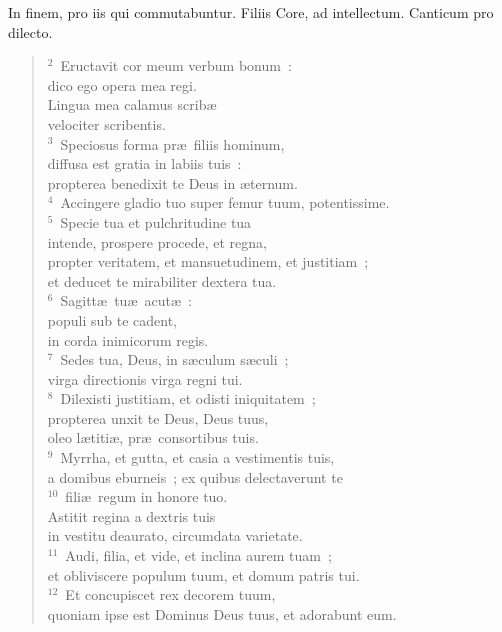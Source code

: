 \bchapter
\lettrine[lines=3,image=true,loversize=0.05,lraise=-0.03]{I}{}n finem, pro iis qui commutabuntur. Filiis Core, ad intellectum. Canticum pro dilecto.
\begin{flushleft}\begin{verse}\vspace{6pt}${}^{2}$~Eructavit cor meum verbum bonum~:\\ dico ego opera mea regi.\\ Lingua mea calamus scrib\ae \\ velociter scribentis.\\
${}^{3}$~Speciosus forma pr\ae\ filiis hominum,\\ diffusa est gratia in labiis tuis~:\\ propterea benedixit te Deus in \ae ternum.\\
${}^{4}$~Accingere gladio tuo super femur tuum, potentissime.\\
${}^{5}$~Specie tua et pulchritudine tua\\ intende, prospere procede, et regna,\\ propter veritatem, et mansuetudinem, et justitiam~;\\ et deducet te mirabiliter dextera tua.\\
${}^{6}$~Sagitt\ae\ tu\ae\ acut\ae~:\\ populi sub te cadent,\\ in corda inimicorum regis.\\
${}^{7}$~Sedes tua, Deus, in s\ae culum s\ae culi~;\\ virga directionis virga regni tui.\\
${}^{8}$~Dilexisti justitiam, et odisti iniquitatem~;\\ propterea unxit te Deus, Deus tuus,\\ oleo l\ae titi\ae , pr\ae\ consortibus tuis.\\
${}^{9}$~Myrrha, et gutta, et casia a vestimentis tuis,\\ a domibus eburneis~; ex quibus delectaverunt te\\
${}^{10}$~fili\ae\ regum in honore tuo.\\ Astitit regina a dextris tuis\\ in vestitu deaurato, circumdata varietate.\\
${}^{11}$~Audi, filia, et vide, et inclina aurem tuam~;\\ et obliviscere populum tuum, et domum patris tui.\\
${}^{12}$~Et concupiscet rex decorem tuum,\\ quoniam ipse est Dominus Deus tuus, et adorabunt eum.\\

\end{verse}
\end{flushleft}
